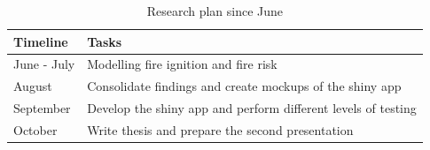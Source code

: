\documentclass[11pt,a4paper,]{article}
\begin{document}
\begin{table}[!h]

\caption{\label{tab:timeline2}Research plan since June}
\centering
\begin{tabular}[t]{ll}
\toprule
Timeline & Tasks\\
\midrule
June - July & Modelling fire ignition and fire risk\\
August & Consolidate findings and create mockups of the shiny app\\
September & Develop the shiny app and perform different levels of testing\\
October & Write thesis and prepare the second presentation\\
\bottomrule
\end{tabular}
\end{table}

\printbibliography
\end{document}
